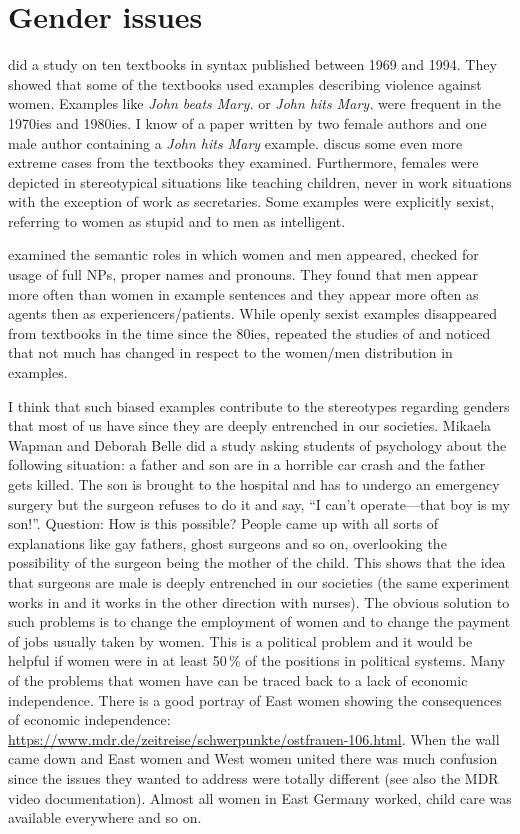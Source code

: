 \section*{Gender issues}


\citet{MB97a} did a study on ten textbooks in syntax published between 1969 and 1994. They showed
that some of the textbooks used examples describing violence against women. Examples like \emph{John
  beats Mary.} or \emph{John hits Mary.} were frequent in the 1970ies and 1980ies. I know of a paper
written by two female authors and one male author containing a \emph{John hits Mary} example. \citet[]{MB97a} discus some even more extreme cases from the textbooks they examined. Furthermore, females were
depicted in stereotypical situations like teaching children, never in work situations with the
exception of work as secretaries. Some examples were explicitly sexist, referring to women as stupid
and to men as intelligent. 


\citeauthor{MB97a} examined the semantic roles in which women and men appeared, checked for
usage of full NPs, proper names and pronouns. They found that men appear more often than women
in example sentences and they appear more often as agents then as experiencers/patients. While
openly sexist examples disappeared from textbooks in the time since the 80ies, \citet{PCKSDMC2017a}
repeated the studies of \citeauthor{MB97a} and noticed that not much has changed in respect to the
women/men distribution in examples. 

I think that such biased examples contribute to the stereotypes regarding genders that most of us
have since they are deeply entrenched in our societies. Mikaela Wapman and Deborah Belle did a study
asking students of psychology about the following situation: a father and son are in a horrible car
crash and the father gets killed. The son is brought to the hospital and has to undergo an emergency
surgery but the surgeon refuses to do it and say, ``I can’t operate—that boy is my son!''. Question:
How is this possible? People came up with all sorts of explanations like gay fathers, ghost surgeons
and so on, overlooking the possibility of the surgeon being the mother of the child. This shows that
the idea that surgeons are male is deeply entrenched in our societies (the same experiment works in
 and it works in the other direction with nurses). The obvious solution to such problems is to
change the employment of women and to change the payment of jobs usually taken by women. This is a
political problem and it would be helpful if women were in at least 50\,\% of the positions in
political systems. Many of the problems that women have can be traced back to a lack of economic
independence. There is a good portray of East  women showing the consequences of economic
independence: \url{https://www.mdr.de/zeitreise/schwerpunkte/ostfrauen-106.html}. When the wall came
down and East  women and West  women united there was much confusion since the issues
they wanted to address were totally different (see also the MDR video documentation). Almost all women in
East Germany worked, child care was available everywhere and so on.


